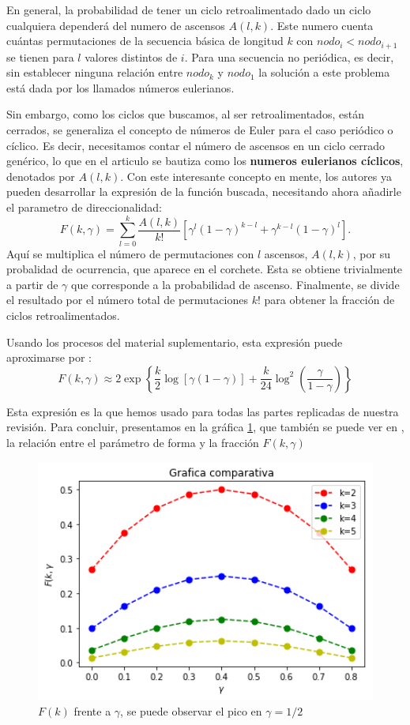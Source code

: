 \documentclass[1p]{elsarticle}
\begin{document}
En general, la probabilidad de tener un ciclo retroalimentado dado un ciclo cualquiera dependerá del numero de ascensos $A(l,k)$.
Este numero cuenta cuántas permutaciones de la secuencia básica de longitud $k$ con $nodo_{i}<nodo_{i+1}$ se tienen para $l$ valores distintos de $i$. Para una secuencia no periódica, es decir, sin establecer ninguna relación entre $nodo_k$ y $nodo_1$
la solución a este problema está dada por los llamados números eulerianos.

 Sin embargo, como los ciclos que buscamos, al ser retroalimentados, están cerrados, se  generaliza el concepto de números de Euler para el caso periódico o cíclico. Es decir, necesitamos contar el número de ascensos en un ciclo cerrado genérico, lo que en el articulo se bautiza como los \textbf{numeros eulerianos cíclicos}, denotados por $A(l,k)$.
Con este interesante concepto en mente, los autores ya pueden desarrollar la expresión de la función buscada, necesitando ahora añadirle el parametro de direccionalidad:
$$
F(k,\gamma)=\sum_{l=0}^{k}\frac{A(l,k)}{k!}[\gamma^l(1-\gamma)^{k-l}+\gamma^{k-l}(1-\gamma)^l]
.
$$
Aquí se multiplica el número de permutaciones con $l$ ascensos, $A(l,k)$, por su probalidad de ocurrencia, que aparece en el corchete.
Esta se obtiene trivialmente a partir de $\gamma$ que corresponde a la probabilidad de ascenso. Finalmente, se divide el resultado por el número total de permutaciones $k!$ para obtener la fracción de ciclos retroalimentados.

Usando los procesos del material suplementario, esta expresión puede aproximarse por :
\begin{equation}
    \label{eq:F_asymp}
    F(k,\gamma)
    \approx 
    2\exp\left\{\frac{k}{2}\log[\gamma(1-\gamma)]+\frac{k}{24} \log^2(\frac{\gamma}{1-\gamma})\right\}
\end{equation}

Esta expresión es la que hemos usado para todas las partes replicadas de nuestra revisión. 
Para concluir, presentamos en la gráfica \ref{h}, que también se puede ver en \cite{arti}, la relación entre el parámetro de forma y la fracción $F(k,\gamma)$

\begin{figure}
	\centering
	\includegraphics[width=12cm]{graf_1.png}
	\caption{$F(k)$ frente a $\gamma$, se puede observar el pico en $\gamma=1/2$}
	\label{h}
\end{figure}
\end{document}
